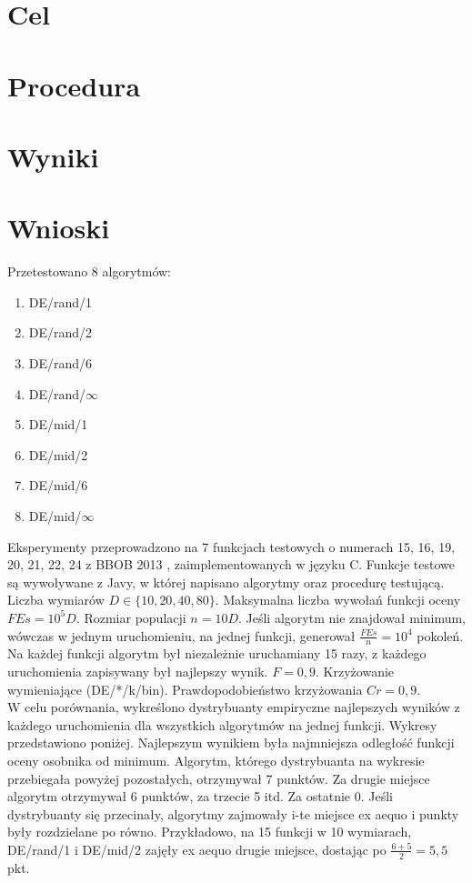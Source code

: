 \section{Cel}

\section{Procedura}

\section{Wyniki}

\section{Wnioski}

Przetestowano 8 algorytmów:

\begin{enumerate}
 \item DE/rand/1
 \item DE/rand/2
 \item DE/rand/6
 \item DE/rand/$\infty$ 
 \item DE/mid/1 
 \item DE/mid/2
 \item DE/mid/6 
 \item DE/mid/$\infty$ 
\end{enumerate} 

Eksperymenty przeprowadzono na 7 funkcjach testowych o numerach 15, 16, 19, 20, 21, 22, 24 z BBOB 2013 \cite{finck}, zaimplementowanych w języku C.
Funkcje testowe są wywoływane z Javy, w której napisano algorytmy oraz procedurę testującą.
Liczba wymiarów $D \in \{10, 20, 40, 80\}$. Maksymalna liczba wywołań funkcji oceny $FEs = 10^5D$. Rozmiar populacji $n = 10D$. 
Jeśli algorytm nie znajdował minimum, wówczas w jednym uruchomieniu, na jednej funkcji, generował $\frac{FEs}{n} = 10^4$ pokoleń.
Na każdej funkcji algorytm był niezależnie uruchamiany 15 razy, z każdego uruchomienia zapisywany był najlepszy wynik.
$F = 0,9$. Krzyżowanie wymieniające (DE/*/k/bin).
Prawdopodobieństwo krzyżowania $Cr = 0,9$. \\

W celu porównania, wykreślono dystrybuanty empiryczne najlepszych wyników z każdego uruchomienia 
dla wszystkich algorytmów na jednej funkcji. Wykresy przedstawiono poniżej.
Najlepszym wynikiem była najmniejsza odległość funkcji oceny osobnika od minimum.
Algorytm, którego dystrybuanta na wykresie przebiegała powyżej pozostałych, otrzymywał 7 punktów. 
Za drugie miejsce algorytm otrzymywał 6 punktów, za trzecie 5 itd. Za ostatnie 0. 
Jeśli dystrybuanty się przecinały, algorytmy zajmowały i-te miejsce ex aequo i punkty były rozdzielane
po równo. 
Przykładowo, na 15 funkcji w 10 wymiarach, DE/rand/1 i DE/mid/2 zajęły ex aequo drugie miejsce,
dostając po $\frac{6+5}{2} = 5,5$ pkt.

